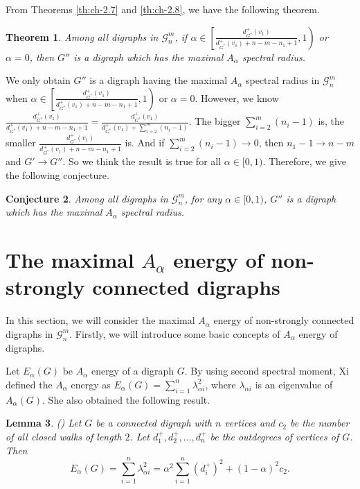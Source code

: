 \documentclass[11pt]{article}
\newtheorem{theorem}{Theorem}[section]
\newtheorem{lemma}[theorem]{Lemma}
\newtheorem{conjecture}[theorem]{Conjecture}
\begin{document}
From Theorems \ref{th:ch-2.7} and \ref{th:ch-2.8}, we have the following theorem.

\noindent\begin{theorem}\label{th:ch-2.9} Among all digraphs in $\mathcal{G}_n^m$, if $\alpha\in\left[\frac{d_{G^*}^+(v_1)}{d_{G^*}^+(v_1)+n-m-n_1+1},1\right)$ or $\alpha=0$, then $G''$ is a digraph which has the maximal $A_\alpha$ spectral radius.
\end{theorem}

We only obtain $G''$ is a digraph having the maximal $A_\alpha$ spectral radius in $\mathcal{G}_n^m$ when $\alpha\in\left[\frac{d_{G^*}^+(v_1)}{d_{G^*}^+(v_1)+n-m-n_1+1},1\right)$ or $\alpha=0$. However, we know $\frac{d_{G^*}^+(v_1)}{d_{G^*}^+(v_1)+n-m-n_1+1}=\frac{d_{G^*}^+(v_1)}{d_{G^*}^+(v_1)+\sum_{i=2}^{m}(n_i-1)}$. The bigger $\sum_{i=2}^{m}(n_i-1)$ is, the smaller $\frac{d_{G^*}^+(v_1)}{d_{G^*}^+(v_1)+n-m-n_1+1}$ is. And if $\sum_{i=2}^{m}(n_i-1)\rightarrow0$, then $n_1-1\rightarrow n-m$ and $G'\rightarrow G''$. So we think the result is true for all $\alpha\in[0,1)$. Therefore, we give the following conjecture.

\noindent\begin{conjecture}\label{co:ch-2.10}  Among all digraphs in $\mathcal{G}_n^m$, for any $\alpha\in[0,1)$, $G''$ is a digraph which has the maximal $A_\alpha$ spectral radius.
\end{conjecture}

\section{The maximal $A_\alpha$ energy of non-strongly connected digraphs}

In this section, we will consider the maximal $A_\alpha$ energy of non-strongly connected digraphs in $\mathcal{G}_n^m$. Firstly, we will introduce some basic concepts of $A_\alpha$ energy of digraphs.

Let $E_\alpha(G)$ be $A_\alpha$ energy of a digraph $G$. By using second spectral moment, Xi \cite{Xi} defined the $A_\alpha$ energy as $E_\alpha(G)=\sum_{i=1}^n \lambda_{\alpha i}^2$, where $\lambda_{\alpha i}$ is an eigenvalue of $A_\alpha(G)$. She also obtained the following result.

\noindent\begin{lemma}\label{le:ch-3.1}(\cite{Xi}) Let $G$ be a connected digraph with $n$ vertices and $c_2$ be the number of all closed walks of length $2$. Let $d_1^+,d_2^+,\ldots,d_n^+$ be the outdegrees of vertices of $G$. Then
$$E_\alpha(G)=\sum_{i=1}^n \lambda_{\alpha i}^2=\alpha^2\sum_{i=1}^n(d_i^+)^2+(1-\alpha)^2c_2.$$
\end{lemma}
\end{document}

